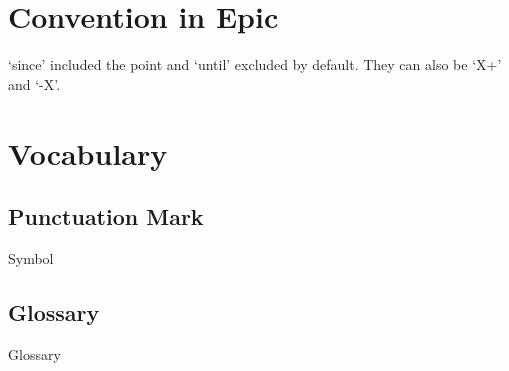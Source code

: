 

\section{Convention in Epic}

`since' included the point and `until' excluded by default. They can also be `X+' and `-X'.



\section{Vocabulary}



\subsection{Punctuation Mark}

{Symbol}



\subsection{Glossary}

{Glossary}

